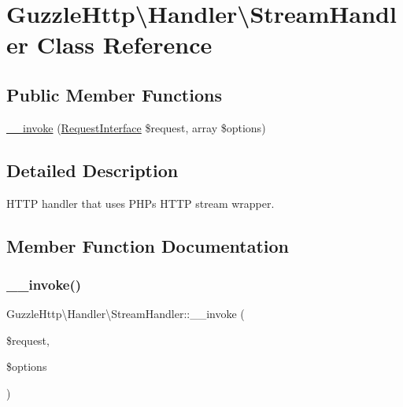 \hypertarget{classGuzzleHttp_1_1Handler_1_1StreamHandler}{}\section{Guzzle\+Http\textbackslash{}Handler\textbackslash{}Stream\+Handler Class Reference}
\label{classGuzzleHttp_1_1Handler_1_1StreamHandler}
\subsection*{Public Member Functions}
\begin{DoxyCompactItemize}
\item 
\hyperlink{classGuzzleHttp_1_1Handler_1_1StreamHandler_a53e42a13a60d3867a7cc580c94478130}{\+\_\+\+\_\+invoke} (\hyperlink{interfacePsr_1_1Http_1_1Message_1_1RequestInterface}{Request\+Interface} \$request, array \$options)
\end{DoxyCompactItemize}


\subsection{Detailed Description}
H\+T\+TP handler that uses P\+HP\textquotesingle{}s H\+T\+TP stream wrapper. 

\subsection{Member Function Documentation}
\mbox{\label{classGuzzleHttp_1_1Handler_1_1StreamHandler_a53e42a13a60d3867a7cc580c94478130}} 
\subsubsection{\texorpdfstring{\+\_\+\+\_\+invoke()}{\_\_invoke()}}
{\footnotesize\ttfamily Guzzle\+Http\textbackslash{}\+Handler\textbackslash{}\+Stream\+Handler\+::\+\_\+\+\_\+invoke (\begin{DoxyParamCaption}\item[{\hyperlink{interfacePsr_1_1Http_1_1Message_1_1RequestInterface}{Request\+Interface}}]{\$request,  }\item[{array}]{\$options }\end{DoxyParamCaption})}

